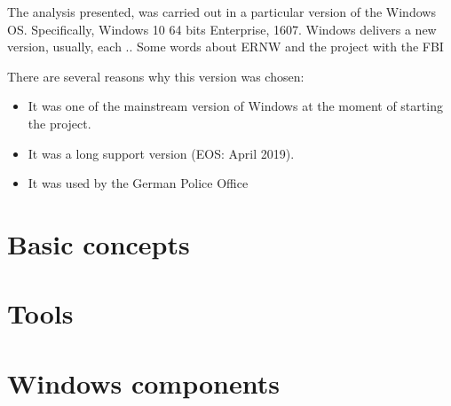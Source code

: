 
The analysis presented, was carried out in a particular version of the Windows OS. Specifically, Windows 10 64 bits Enterprise, 1607. Windows delivers a new version, usually, each  .. 
Some words about ERNW and the project with the FBI

There are several reasons why this version was chosen:
\begin{itemize}
    \item It was one of the mainstream version of Windows at the moment of starting the project.
    \item It was a long support version (EOS: April 2019).
    \item It was used by the German Police Office
\end{itemize}

\section{Basic concepts}
    

\section{Tools}
    

\section{Windows components}
    

